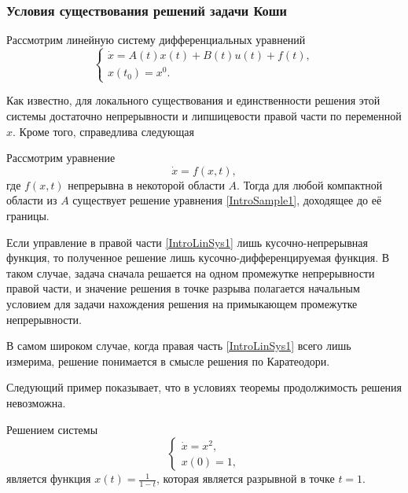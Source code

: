 \subsubsection{Условия существования решений задачи Коши}
Рассмотрим линейную систему дифференциальных уравнений
\begin{equation}
\label{IntroLinSys1}
  \begin{cases}
    \dot{x}= A(t)x(t) + B(t)u(t) + f(t),\\
    x(t_0) = x^0. 
  \end{cases}
\end{equation}

Как известно, для локального существования и единственности решения
этой системы достаточно непрерывности и
липшицевости правой части по переменной $x$.
Кроме того, справедлива следующая
\begin{theorem}
Рассмотрим уравнение
\begin{equation}
\label{IntroSample1}
  \dot{x} = f(x,t), 
\end{equation}
где $f(x,t)$ непрерывна в некоторой области $A$.
Тогда для любой компактной области из $A$ существует решение уравнения
\eqref{IntroSample1}, доходящее до её границы. 
\end{theorem}

\begin{note}
Если управление в правой части \eqref{IntroLinSys1} лишь
кусочно-непрерывная функция,
то полученное решение лишь кусочно-дифференцируемая функция.
В таком случае, задача сначала решается
на одном промежутке непрерывности правой части,
и значение решения в точке разрыва
полагается начальным условием для задачи нахождения решения
на примыкающем промежутке непрерывности.

В самом широком случае,
когда правая часть \eqref{IntroLinSys1} всего лишь измерима,
решение понимается в смысле решения по Каратеодори.
\end{note}

Следующий пример показывает,
что в условиях теоремы продолжимость решения невозможна.
\begin{ex}
Решением системы
\begin{equation*}
  \begin{cases}
	  \dot{x} = x^2,\\
	  x(0) = 1,
  \end{cases}
\end{equation*}
является функция
$x(t) = \frac{1}{1-t}$, которая является разрывной в точке $t = 1$.
\end{ex}

